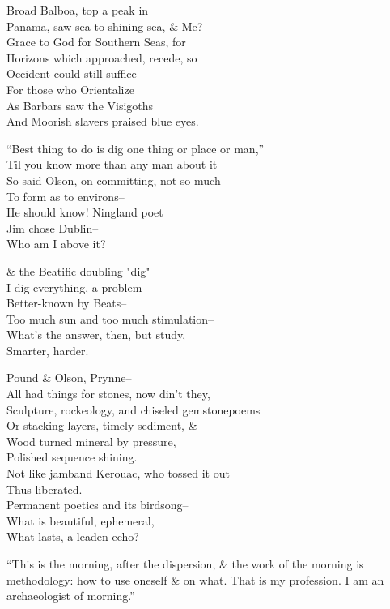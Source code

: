 Broad Balboa, top a peak in \\
Panama, saw sea to shining sea, \& Me? \\
Grace to God for Southern Seas, for \\
Horizons which approached, recede, so \\
Occident could still suffice \\
For those who Orientalize \\
As Barbars saw the Visigoths \\
And Moorish slavers praised blue eyes.

``Best thing to do is dig one thing or place or man,'' \\
Til you know more than any man about it \\
So said Olson, on committing, not so much \\
To form as to environs-- \\
He should know! Ningland poet \\
Jim chose Dublin-- \\
Who am I above it?

\& the Beatific doubling "dig" \\
I dig everything, a problem \\
Better-known by Beats-- \\
Too much sun and too much stimulation-- \\
What's the answer, then, but study, \\
Smarter, harder.

Pound \& Olson, Prynne-- \\
All had things for stones, now din't they, \\
Sculpture, rockeology, and chiseled gemstonepoems \\
Or stacking layers, timely sediment, \& \\
Wood turned mineral by pressure, \\
Polished sequence shining. \\
Not like jamband Kerouac, who tossed it out \\
Thus liberated. \\
Permanent poetics and its birdsong-- \\
What is beautiful, ephemeral, \\
What lasts, a leaden echo?

``This is the morning, after the dispersion, \& the work of the morning is methodology: how to use oneself \& on what. That is my profession. I am an archaeologist of morning.''

